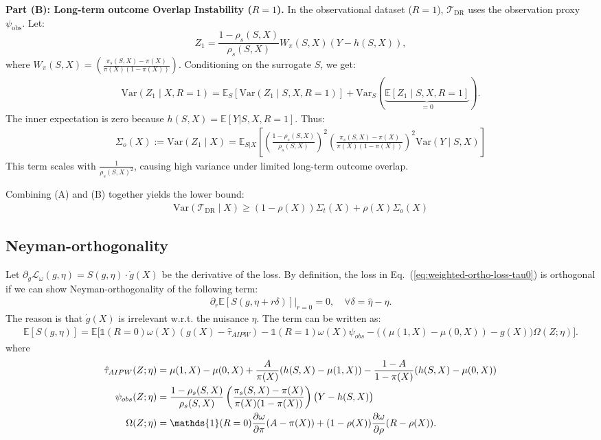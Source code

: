 \documentclass{article}
\theoremstyle{plain}
\theoremstyle{definition}
\theoremstyle{remark}
\newcommand{\E}{\mathbb{E}}                %
\newcommand{\var}{\mathrm{Var}}            %
\newcommand{\1}{\mathds{1}}                %
\begin{document}
\textbf{Part (B): Long-term outcome Overlap Instability ($R=1$).}
In the observational dataset ($R=1$), $\mathcal{T}_{\mathrm{DR}}$ uses the observation proxy $\psi_{\mathrm{obs}}$. Let:
$$
Z_1 = \frac{1-\rho_s(S,X)}{\rho_s(S,X)} W_{\pi}(S,X) (Y - h(S,X)),
$$
where $W_{\pi}(S,X)=\left( \frac{\pi_s(S,X) - \pi(X)}{\pi(X)(1-\pi(X))} \right)$.
Conditioning on the surrogate $S$, we get:
\begin{align}
    \var(Z_1 \mid X, R=1) = \mathbb{E}_{S}[\var(Z_1 \mid S, X, R=1)] + \var_{S}(\underbrace{\mathbb{E}[Z_1 \mid S, X, R=1]}_{=0}).
\end{align}
The inner expectation is zero because $h(S,X) = \mathbb{E}[Y|S,X, R=1]$. Thus:
\begin{align}
    \Sigma_o(X) := \var(Z_1 \mid X) = \mathbb{E}_{S|X} \left[ \left( \frac{1-\rho_s(S,X)}{\rho_s(S,X)} \right)^2 \left(\frac{\pi_s(S,X) - \pi(X)}{\pi(X)(1-\pi(X))} \right)^2 \var(Y \mid S, X) \right]
\end{align}
This term scales with $\frac{1}{\rho_s(S,X)^2}$, causing high variance under limited long-term outcome overlap.

Combining (A) and (B) together yields the lower bound:
\begin{align}
    \var(\mathcal{T}_{\mathrm{DR}} \mid X) \geq (1-\rho(X)) \Sigma_{t}(X) + \rho(X) \Sigma_{o}(X)
\end{align}


\subsection{Neyman-orthogonality}
\label{app:proof-neyman}
Let $\partial_g \mathcal{L}_\omega(g, \eta) = S(g, \eta) \cdot \dot{g}(X) $ be the derivative of the loss. By definition, the loss in Eq.~(\ref{eq:weighted-ortho-loss-tau0}) is orthogonal if we can show Neyman-orthogonality of the following term:
\begin{align}
    \partial_r \mathbb{E}[S(g, \eta + r\delta)] \big|_{r=0} = 0, \quad \forall \delta=\hat\eta-\eta.
\end{align}
The reason is that $\dot{g}(X)$ is irrelevant w.r.t. the nuisance $\eta$. The term can be written as:
\begin{align}
    \label{gradient-S}
    \E[S(g,\eta)] = \mathbb{E}\Big[ \1(R=0)\omega(X)(g(X) - \hat{\tau}_{AIPW}) - \1(R=1)\omega(X)\psi_{obs} - \big( (\mu(1,X)-\mu(0,X)) - g(X) \big) \Omega(Z;\eta)\Big].
\end{align}
where
\begin{align}
    \hat{\tau}_{AIPW}(Z;\eta) &= \mu(1,X) - \mu(0,X) \notag  + \frac{A}{\pi(X)}(h(S,X) - \mu(1,X)) - \frac{1-A}{1-\pi(X)}(h(S,X) - \mu(0,X)) \\
    \psi_{obs}(Z;\eta) &= \frac{1-\rho_s(S,X)}{\rho_s(S,X)} \left( \frac{\pi_s(S,X) - \pi(X)}{\pi(X)(1-\pi(X))} \right) \big( Y - h(S,X) \big) \\
    \Omega(Z;\eta) &= \1(R=0) \frac{\partial \omega}{\partial \pi} (A - \pi(X)) + (1-\rho(X)) \frac{\partial \omega}{\partial \rho} (R - \rho(X)).
\end{align}
\end{document}
